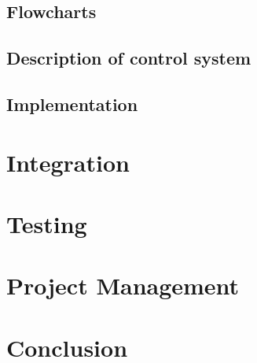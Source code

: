 \subsection*{Flowcharts}

\subsection*{Description of control system}

\subsection*{Implementation}

\section*{Integration}

\section{Testing}

\section{Project Management}

\section{Conclusion}

\nocite{*}

\raggedright
\titlespacing*{\chapter}{0pt}{-10pt}{40pt}
\newpage
\newpage
\appendix
\renewcommand\thesection{\Roman{section}}
\renewcommand\thesubsection{\roman{subsection}}
\label{sec:app}
% 
% 

\vspace{10ex}

